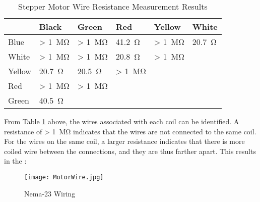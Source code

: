 \begin{table}[h!]
	\centering
	\caption{Stepper Motor Wire Resistance Measurement Results}
	\begin{tabularx}{\textwidth}{X X X X X X  }
		\toprule
		       & Black               & Green               & Red                 & Yellow              & White           \\
		\midrule
		Blue   & > \SI{1}{\mega\ohm} & > \SI{1}{\mega\ohm} & \SI{41.2}{\ohm}     & > \SI{1}{\mega\ohm} & \SI{20.7}{\ohm} \\
		White  & > \SI{1}{\mega\ohm} & > \SI{1}{\mega\ohm} & \SI{20.8}{\ohm}     & > \SI{1}{\mega\ohm} &                 \\
		Yellow & \SI{20.7}{\ohm}     & \SI{20.5}{\ohm}     & > \SI{1}{\mega\ohm} &                     &                 \\
		Red    & > \SI{1}{\mega\ohm} & > \SI{1}{\mega\ohm} &                     &                     &                 \\
		Green  & \SI{40.5}{\ohm}     &                     &                     &                     &                 \\
		\bottomrule
	\end{tabularx}
	\label{tab:nemaTest}
\end{table}

From Table \ref{tab:nemaTest} above, the wires associated with each coil can be identified. A resistance of > \SI{1}{\mega\ohm} indicates that the wires are not connected to the same coil. For the wires on the same coil, a larger resistance indicates that there is more coiled wire between the connections, and they are thus farther apart. This results in the :

\begin{figure}[h!]
	\begin{center}
		\texttt{[image: MotorWire.jpg]}
		\caption{Nema-23 Wiring}
		\label{fig:motorWire}
	\end{center}
\end{figure}
